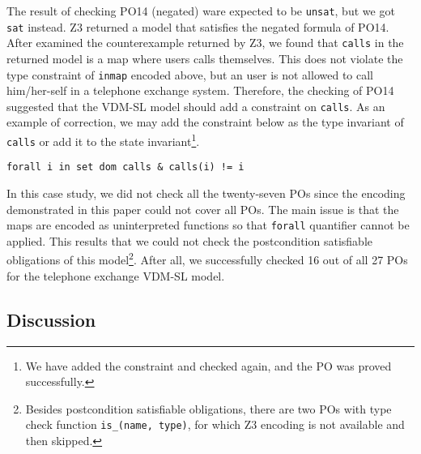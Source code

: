 The result of checking PO14 (negated) ware expected to be {\tt unsat}, but we got {\tt sat} instead. Z3 returned a model that satisfies the negated formula of PO14. After examined the counterexample returned by Z3, we found that {\tt calls} in the returned model is a map where users calls themselves. This does not violate the type constraint of {\tt inmap} encoded above, but an user is not allowed to call him/her-self in a telephone exchange system. Therefore, the checking of PO14 suggested that the VDM-SL model should add a constraint on {\tt calls}. As an example of correction, we may add the constraint below as the type invariant of {\tt calls} or add it to the state invariant\footnote{We have added the constraint and checked again, and the PO was proved successfully.}.

\begin{mdframed}[roundcorner=5pt]
\begin{Verbatim}[fontsize=\small]
forall i in set dom calls & calls(i) != i
\end{Verbatim}
\end{mdframed}

In this case study, we did not check all the twenty-seven POs since the encoding demonstrated in this paper could not cover all POs. The main issue is that the maps are encoded as uninterpreted functions so that {\tt forall} quantifier cannot be applied. This results that we could not check the postcondition satisfiable obligations of this model\footnote{Besides postcondition satisfiable obligations, there are two POs with type check function {\tt is\_(name, type)}, for which Z3 encoding is not available and then skipped.}. After all, we successfully checked 16 out of all 27 POs for the telephone exchange VDM-SL model.


\subsection{Discussion}


